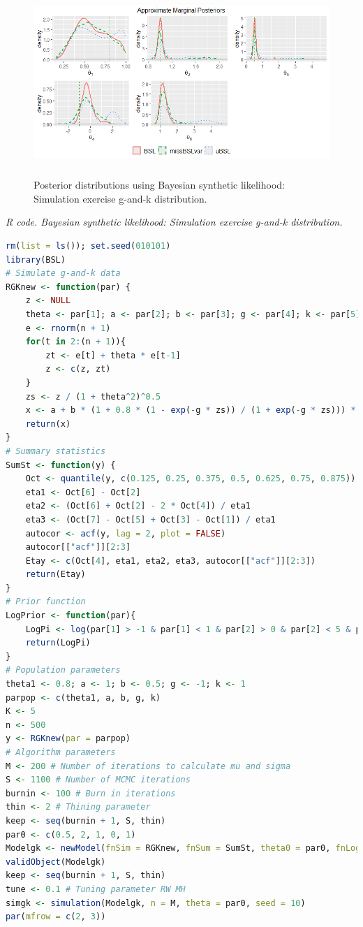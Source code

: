 \begin{enumerate}[leftmargin=*]
\begin{figure}[!h]
	\includegraphics[width=340pt, height=200pt]{Chapters/chapter15/figures/BLSgkSim.png}
	\caption[List of figure caption goes here]{Posterior distributions using Bayesian synthetic likelihood: Simulation exercise g-and-k distribution.}\label{figSBLsimgk}
\end{figure}

\begin{tcolorbox}[enhanced,width=4.67in,center upper,
	fontupper=\large\bfseries,drop shadow southwest,sharp corners]
	\textit{R code. Bayesian synthetic likelihood: Simulation exercise g-and-k distribution.}
	\begin{VF}
		\begin{lstlisting}[language=R]
rm(list = ls()); set.seed(010101)
library(BSL)
# Simulate g-and-k data
RGKnew <- function(par) {
	z <- NULL
	theta <- par[1]; a <- par[2]; b <- par[3]; g <- par[4]; k <- par[5]
	e <- rnorm(n + 1)
	for(t in 2:(n + 1)){
		zt <- e[t] + theta * e[t-1]
		z <- c(z, zt)
	}
	zs <- z / (1 + theta^2)^0.5
	x <- a + b * (1 + 0.8 * (1 - exp(-g * zs)) / (1 + exp(-g * zs))) * (1 + zs^2)^k * zs
	return(x)
}
# Summary statistics
SumSt <- function(y) {
	Oct <- quantile(y, c(0.125, 0.25, 0.375, 0.5, 0.625, 0.75, 0.875))
	eta1 <- Oct[6] - Oct[2]
	eta2 <- (Oct[6] + Oct[2] - 2 * Oct[4]) / eta1
	eta3 <- (Oct[7] - Oct[5] + Oct[3] - Oct[1]) / eta1
	autocor <- acf(y, lag = 2, plot = FALSE)
	autocor[["acf"]][2:3]
	Etay <- c(Oct[4], eta1, eta2, eta3, autocor[["acf"]][2:3])
	return(Etay)
}
# Prior function
LogPrior <- function(par){
	LogPi <- log(par[1] > -1 & par[1] < 1 & par[2] > 0 & par[2] < 5 & par[3] > 0 & par[3] < 5 & par[4] > -5 & par[4] < 5 & par[5] > -0.5 & par[5] < 5)
	return(LogPi)
}
# Population parameters
theta1 <- 0.8; a <- 1; b <- 0.5; g <- -1; k <- 1
parpop <- c(theta1, a, b, g, k)
K <- 5
n <- 500
y <- RGKnew(par = parpop)
# Algorithm parameters
M <- 200 # Number of iterations to calculate mu and sigma
S <- 1100 # Number of MCMC iterations
burnin <- 100 # Burn in iterations
thin <- 2 # Thining parameter
keep <- seq(burnin + 1, S, thin)
par0 <- c(0.5, 2, 1, 0, 1) 
Modelgk <- newModel(fnSim = RGKnew, fnSum = SumSt, theta0 = par0, fnLogPrior = LogPrior, verbose = FALSE)
validObject(Modelgk)
keep <- seq(burnin + 1, S, thin)
tune <- 0.1 # Tuning parameter RW MH
simgk <- simulation(Modelgk, n = M, theta = par0, seed = 10)
par(mfrow = c(2, 3))
\end{lstlisting}
	\end{VF}
\end{tcolorbox}


\end{enumerate}
